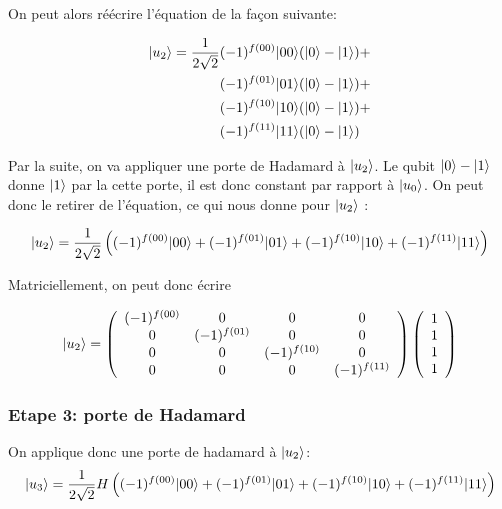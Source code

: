 \documentclass[12pt,a4paper]{article}
\DeclarePairedDelimiter\ket{\lvert}{\rangle}
\begin{document}
On peut alors réécrire l'équation de la façon suivante: 



\begin{align*}
  \ket{u_2} = \frac{1}{2\sqrt{2}} & (-1)^{f(00)} \ket{00}  (\ket{0} - \ket{1}) + \\
&(-1)^{f(01)} \ket{01}  (\ket{0} - \ket{1}) + \\
&(-1)^{f(10)} \ket{10}  (\ket{0} - \ket{1}) + \\
&(-1)^{f(11)} \ket{11}  (\ket{0} - \ket{1}) 
\end{align*}

Par la suite, on va appliquer une porte de Hadamard à $\ket{u_2}$. Le qubit $\ket{0} - \ket{1}$ donne $\ket{1}$ par la cette porte, il est donc constant par rapport à $\ket{u_0}$. On peut donc le retirer de l'équation, ce qui nous donne pour $\ket{u_2}$ :

\begin{equation}
  \label{eq:3}
\ket{u_2} = \frac{1}{2\sqrt{2}} \left( (-1)^{f(00)} \ket{00} + (-1)^{f(01)} \ket{01} + (-1)^{f(10)} \ket{10} + (-1)^{f(11)} \ket{11} \right) 
\end{equation}


Matriciellement, on peut donc écrire

\begin{equation}
  \label{eq:4}
\ket{u_2} = \left(  \begin{array}{cccc}
     (-1)^{f(00)}  &0 & 0 &0 \\
     0 & (-1)^{f(01)} & 0 &0 \\
     0 &0 & (-1)^{f(10)} &0 \\
     0 &0 & 0 & (-1)^{f(11)} \\
        \end{array}
      \right)
      \left(  \begin{array}{c}
                1 \\
                1 \\
                1 \\
                1 
              \end{array}
      \right)      
\end{equation}


\subsubsection{Etape 3: porte de Hadamard}

On applique donc une porte de hadamard à $\ket{u_2}$:
\begin{equation}
  \label{eq:5}
\ket{u_3} = \frac{1}{2\sqrt{2}} H \left( (-1)^{f(00)} \ket{00} + (-1)^{f(01)} \ket{01} + (-1)^{f(10)} \ket{10} + (-1)^{f(11)} \ket{11} \right) 
\end{equation}
\end{document}
